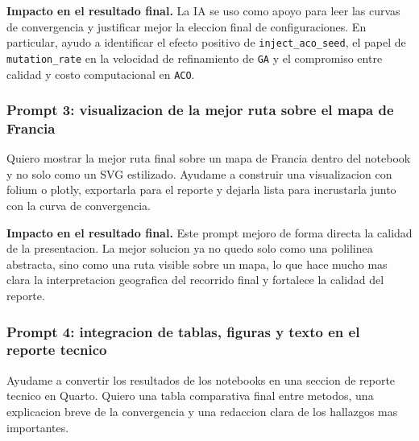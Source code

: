 \documentclass[
  12pt,
  letterpaper,
  DIV=11,
  numbers=noendperiod]{scrartcl}
\newenvironment{Shaded}{\begin{snugshade}}{\end{snugshade}}
\newcommand{\NormalTok}[1]{\textcolor[rgb]{0.00,0.23,0.31}{#1}}
\begin{document}
\textbf{Impacto en el resultado final.} La IA se uso como apoyo para
leer las curvas de convergencia y justificar mejor la eleccion final de
configuraciones. En particular, ayudo a identificar el efecto positivo
de \texttt{inject\_aco\_seed}, el papel de \texttt{mutation\_rate} en la
velocidad de refinamiento de \texttt{GA} y el compromiso entre calidad y
costo computacional en \texttt{ACO}.

\subsubsection{Prompt 3: visualizacion de la mejor ruta sobre el mapa de
Francia}\label{prompt-3-visualizacion-de-la-mejor-ruta-sobre-el-mapa-de-francia}

\begin{Shaded}
\begin{Highlighting}[]
\NormalTok{Quiero mostrar la mejor ruta final sobre un mapa de Francia dentro del notebook y no solo como un SVG estilizado. Ayudame a construir una visualizacion con folium o plotly, exportarla para el reporte y dejarla lista para incrustarla junto con la curva de convergencia.}
\end{Highlighting}
\end{Shaded}

\textbf{Impacto en el resultado final.} Este prompt mejoro de forma
directa la calidad de la presentacion. La mejor solucion ya no quedo
solo como una polilinea abstracta, sino como una ruta visible sobre un
mapa, lo que hace mucho mas clara la interpretacion geografica del
recorrido final y fortalece la calidad del reporte.

\subsubsection{Prompt 4: integracion de tablas, figuras y texto en el
reporte
tecnico}\label{prompt-4-integracion-de-tablas-figuras-y-texto-en-el-reporte-tecnico}

\begin{Shaded}
\begin{Highlighting}[]
\NormalTok{Ayudame a convertir los resultados de los notebooks en una seccion de reporte tecnico en Quarto. Quiero una tabla comparativa final entre metodos, una explicacion breve de la convergencia y una redaccion clara de los hallazgos mas importantes.}
\end{Highlighting}
\end{Shaded}
\end{document}
